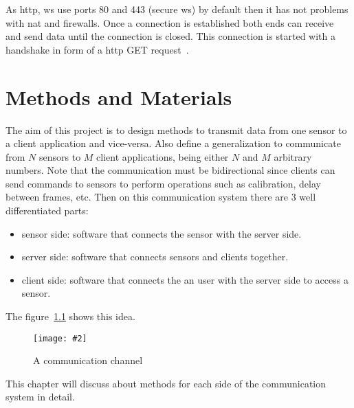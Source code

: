 \documentclass[hidelinks,11pt,a4paper,oneside,article]{memoir}
\newcommand{\putimage}[3][10] %
{
\begin{figure}[h]
	\centering
	\captionsetup{justification=centering}
	\texttt{[image: \#2]}
	\caption{#3}
	\label{fig:#2}
\end{figure}
}
\begin{document}
As \gls{http}, \gls{ws} use ports 80 and 443 (secure \gls{ws}) by default then it has not problems with \gls{nat} and firewalls. Once a connection is established both ends can receive and send data until the connection is closed. This connection is started with a handshake in form of a \gls{http} GET request~\cite[6]{rfc6455}. 






\clearpage\chapter{Methods and Materials}\label{sec:methods-and-materials}

The aim of this project is to design methods to transmit data from one sensor to a client application and vice-versa. Also define a generalization to communicate from $N$ sensors to $M$ client applications, being either $N$ and $M$ arbitrary numbers. Note that the communication must be bidirectional since clients can send commands to sensors to perform operations such as calibration, delay between frames, etc. Then on this communication system there are 3 well differentiated parts:
\begin{itemize}
    \item sensor side: software that connects the sensor with the server side.
    \item server side: software that connects sensors and clients together.
    \item client side: software that connects the an user with the server side to access a sensor.
\end{itemize}

The figure~\ref{fig:communication-channel} shows this idea.

\putimage{communication-channel}{A communication channel}

This chapter will discuss about methods for each side of the communication system in detail.
\end{document}
